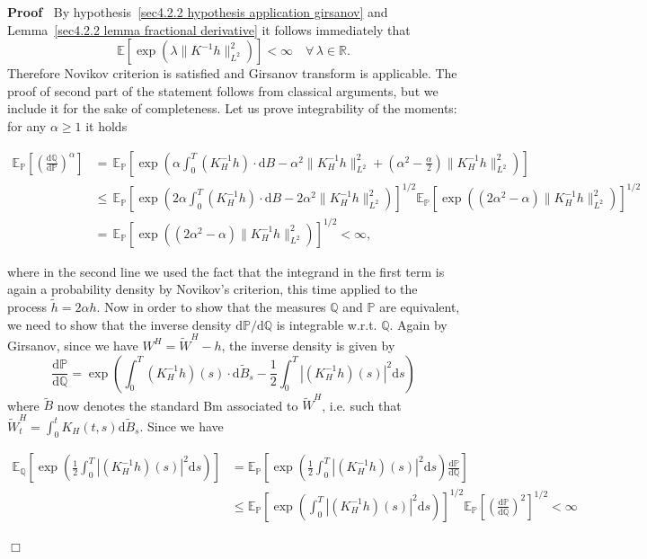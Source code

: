 \documentclass[10pt]{article}
\newcommand{\mathd}{\mathrm{d}}
\newenvironment{proof}{\noindent\textbf{Proof\ }}{\hspace*{\fill}$\Box$\medskip}
\begin{document}
\begin{proof}
  By hypothesis~{\eqref{sec4.2.2 hypothesis application girsanov}} and
  Lemma~\ref{sec4.2.2 lemma fractional derivative} it follows immediately that
  \[ \mathbb{E} [\exp (\lambda \| K^{- 1} h \|_{L^2}^2)] < \infty \quad
     \forall \, \lambda \in \mathbb{R}. \]
  Therefore Novikov criterion is satisfied and Girsanov transform is
  applicable. The proof of second part of the statement follows from classical
  arguments, but we include it for the sake of completeness. Let us prove
  integrability of the moments: for any $\alpha \geqslant 1$ it holds
  
  \begin{align*}
    \mathbb{E}_{\mathbb{P}} \left[ \left( \frac{\mathd \mathbb{Q}}{\mathd
    \mathbb{P}} \right)^{\alpha} \right] & = \, \mathbb{E}_{\mathbb{P}} \left[
    \exp \left( \alpha \int_0^T (K^{- 1}_H h) \cdot \mathd B - \alpha^2 \|
    K^{- 1}_H h \|_{L^2}^2 + \left( \alpha^2 - \frac{\alpha}{2} \right)  \|
    K^{- 1}_H h \|_{L^2}^2 \right) \right]\\
    & \leqslant \, \mathbb{E}_{\mathbb{P}} \left[ \exp \left( 2 \alpha
    \int_0^T (K^{- 1}_H h) \cdot \mathd B - 2 \alpha^2  \| K^{- 1}_H h
    \|_{L^2}^2 \right) \right]^{1 / 2} \mathbb{E}_{\mathbb{P}} [\exp ((2
    \alpha^2 - \alpha) \| K^{- 1}_H h \|_{L^2}^2)]^{1 / 2}\\
    & = \, \mathbb{E}_{\mathbb{P}} [\exp ((2 \alpha^2 - \alpha) \| K^{- 1}_H
    h \|_{L^2}^2)]^{1 / 2} < \infty,
  \end{align*}
  
  where in the second line we used the fact that the integrand in the first
  term is again a probability density by Novikov's criterion, this time
  applied to the process $\tilde{h} = 2 \alpha h$. Now in order to show that
  the measures $\mathbb{Q}$ and $\mathbb{P}$ are equivalent, we need to show
  that the inverse density $\mathd \mathbb{P}/ \mathd \mathbb{Q}$ is
  integrable w.r.t. $\mathbb{Q}$. Again by Girsanov, since we have $W^H =
  \tilde{W}^H - h$, the inverse density is given by
  \[ \frac{\mathd \mathbb{P}}{\mathd \mathbb{Q}} = \exp \left( \int_0^T (K^{-
     1}_H h) (s) \cdot \mathd \tilde{B}_s - \frac{1}{2} \int_0^T | (K^{- 1}_H
     h) (s) |^2 \mathd s \right) \]
  where $\tilde{B}$ now denotes the standard Bm associated to $\tilde{W}^H$,
  i.e. such that $\tilde{W}^H_t = \int^t_0 K_H (t, s) \mathd \tilde{B}_s$.
  Since we have
  
  \begin{align*}
    \mathbb{E}_{\mathbb{Q}} \left[ \exp \left( \frac{1}{2} \int_0^T | (K^{-
    1}_H h) (s) |^2 \mathd s \right) \right] & =\mathbb{E}_{\mathbb{P}} \left[
    \exp \left( \frac{1}{2} \int_0^T | (K^{- 1}_H h) (s) |^2 \mathd s \right) 
    \frac{\mathd \mathbb{P}}{\mathd \mathbb{Q}} \right]\\
    & \leqslant \mathbb{E}_{\mathbb{P}} \left[ \exp \left( \int_0^T | (K^{-
    1}_H h) (s) |^2 \mathd s \right) \right]^{1 / 2} \mathbb{E}_{\mathbb{P}}
    \left[ \left( \frac{\mathd \mathbb{P}}{\mathd \mathbb{Q}} \right)^2
    \right]^{1 / 2} < \infty
  \end{align*}
  

\end{proof}
\end{document}
